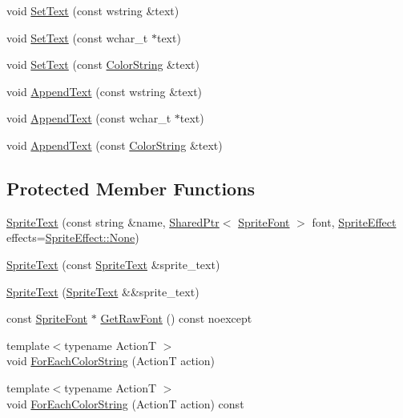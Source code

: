 \begin{DoxyCompactItemize}
\item 
void \hyperlink{classmage_1_1_sprite_text_ac33e512ab29554a306ada9a378ab00eb}{Set\+Text} (const wstring \&text)
\item 
void \hyperlink{classmage_1_1_sprite_text_a03d5012e2812d422a1285a4a0abb104f}{Set\+Text} (const wchar\+\_\+t $\ast$text)
\item 
void \hyperlink{classmage_1_1_sprite_text_a3ca23b77ab252f226d6525dfc2cb3d11}{Set\+Text} (const \hyperlink{structmage_1_1_color_string}{Color\+String} \&text)
\item 
void \hyperlink{classmage_1_1_sprite_text_acf993532a7b2e6ebb761b9b47cbdba98}{Append\+Text} (const wstring \&text)
\item 
void \hyperlink{classmage_1_1_sprite_text_a462809b9138f94720f972505a4f74d81}{Append\+Text} (const wchar\+\_\+t $\ast$text)
\item 
void \hyperlink{classmage_1_1_sprite_text_a914e7f755cf8b6ddd22dd66c9108029b}{Append\+Text} (const \hyperlink{structmage_1_1_color_string}{Color\+String} \&text)
\end{DoxyCompactItemize}
\subsection*{Protected Member Functions}
\begin{DoxyCompactItemize}
\item 
\hyperlink{classmage_1_1_sprite_text_ad2396075b3c1146a691cb0e8081247e2}{Sprite\+Text} (const string \&name, \hyperlink{namespacemage_a1e01ae66713838a7a67d30e44c67703e}{Shared\+Ptr}$<$ \hyperlink{classmage_1_1_sprite_font}{Sprite\+Font} $>$ font, \hyperlink{namespacemage_a9cfe18123066ba4236f548f9de75d881}{Sprite\+Effect} effects=\hyperlink{namespacemage_a9cfe18123066ba4236f548f9de75d881a6adf97f83acf6453d4a6a4b1070f3754}{Sprite\+Effect\+::\+None})
\item 
\hyperlink{classmage_1_1_sprite_text_a3e56a7882dd714a6d8f2452d4f7071ff}{Sprite\+Text} (const \hyperlink{classmage_1_1_sprite_text}{Sprite\+Text} \&sprite\+\_\+text)
\item 
\hyperlink{classmage_1_1_sprite_text_ab03ba1fb607ce86d28b742fc020c8a62}{Sprite\+Text} (\hyperlink{classmage_1_1_sprite_text}{Sprite\+Text} \&\&sprite\+\_\+text)
\item 
const \hyperlink{classmage_1_1_sprite_font}{Sprite\+Font} $\ast$ \hyperlink{classmage_1_1_sprite_text_ab3124ee856ef6da31745af152840a8ce}{Get\+Raw\+Font} () const noexcept
\item 
{\footnotesize template$<$typename ActionT $>$ }\\void \hyperlink{classmage_1_1_sprite_text_ad975957b908ad3926ace75fb60ff4474}{For\+Each\+Color\+String} (ActionT action)
\item 
{\footnotesize template$<$typename ActionT $>$ }\\void \hyperlink{classmage_1_1_sprite_text_abc70368fd800a82cbd1ec31f51d4db17}{For\+Each\+Color\+String} (ActionT action) const
\end{DoxyCompactItemize}

